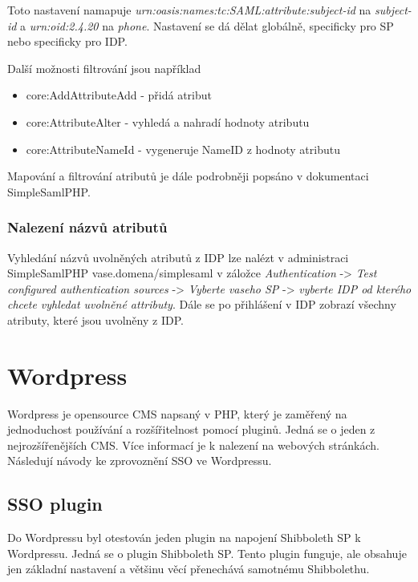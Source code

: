 Toto nastavení namapuje \emph{urn:oasis:names:tc:SAML:attribute:subject-id} na \emph{subject-id} a \emph{urn:oid:2.4.20} na \emph{phone}. Nastavení se dá dělat globálně, specificky pro SP nebo specificky pro IDP.

Další možnosti filtrování jsou například
\begin{itemize}
    \item core:AddAttributeAdd - přidá atribut
    \item core:AttributeAlter - vyhledá a nahradí hodnoty atributu
    \item core:AttributeNameId - vygeneruje NameID z hodnoty atributu
\end{itemize}

Mapování a filtrování atributů je dále podrobněji popsáno v dokumentaci SimpleSamlPHP. \cite{Authentication-Processing-Filters-in-SimpleSAMLphp}


\subsubsection{Nalezení názvů atributů} %
Vyhledání názvů uvolněných atributů z IDP lze nalézt v administraci SimpleSamlPHP vase.domena/simplesaml v záložce \emph{Authentication} -> \emph{Test configured authentication sources} -> \emph{Vyberte vaseho SP} -> \emph{vyberte IDP od kterého chcete vyhledat uvolněné attributy}. Dále se po přihlášení v IDP zobrazí všechny atributy, které jsou uvolněny z IDP.


\section{Wordpress} %

Wordpress je opensource CMS napsaný v PHP, který je zaměřený na jednoduchost používání a rozšířitelnost pomocí pluginů. Jedná se o jeden z nejrozšířenějších CMS. Více informací je k nalezení na webových stránkách\cite{wordpress}.
\\
Následují návody ke zprovoznění SSO ve Wordpressu.

\subsection{SSO plugin} %
Do Wordpressu byl otestován jeden plugin na napojení Shibboleth SP k Wordpressu. Jedná se o plugin Shibboleth SP\cite{ShibbolethSpWp}. Tento plugin funguje, ale obsahuje jen základní nastavení a většinu věcí přenechává samotnému Shibbolethu.

